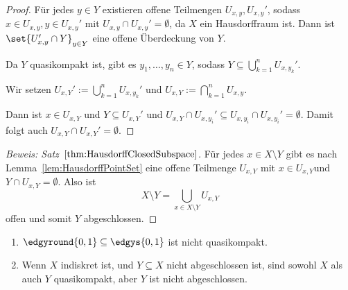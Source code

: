 \documentclass[language=ngerman]{TemplateLecture} %
\begin{document}
\begin{proof}
    Für jedes $y \in Y$ existieren offene Teilmengen $U_{x,y}, U_{x,y}'$, sodass $x \in U_{x,y}, y \in U_{x,y}'$ mit $U_{x,y} \cap U_{x,y}' = \emptyset$, da $X$ ein Hausdorffraum ist. Dann ist $\set{U_{x,y}' \cap Y}_{y \in Y}$ eine offene Überdeckung von $Y$.
    
    Da $Y$ quasikompakt ist, gibt es $y_1, \ldots, y_n \in Y$, sodass $Y \subseteq \bigcup_{k = 1}^n U_{x,y_k}'$.

    Wir setzen $U_{x,Y}' := \bigcup_{k = 1}^n U_{x,y_k}'$ und $U_{x,Y} := \bigcap_{k = 1}^n U_{x,y}$.

    Dann ist $x \in U_{x,Y}$ und $Y \subseteq U_{x,Y}'$ und $U_{x,Y} \cap U_{x,y_i}' \subseteq U_{x,y_i} \cap U_{x,y_i}' = \emptyset$. Damit folgt auch $U_{x,Y} \cap U_{x,Y}' = \emptyset$.
\end{proof}

\begin{proof}[Beweis: Satz~$\ref{thm:HausdorffClosedSubspace}$]
    Für jedes $x \in X \setminus Y$ gibt es nach Lemma~\ref{lem:HausdorffPointSet} eine offene Teilmenge $U_{x,Y}$ mit $x \in U_{x,Y}$und $Y \cap U_{x,Y} = \emptyset$. Also ist
    \begin{equation*}
        X \setminus Y = \bigcup_{x \in X \setminus Y} U_{x,Y}
    \end{equation*} 
    offen und somit $Y$ abgeschlossen.
\end{proof}

\begin{example}\leavevmode
    \begin{enumerate}[$(i)$]
        \item $\edgyround{0,1} \subseteq \edgys{0,1}$ ist nicht quasikompakt. 
        \item Wenn $X$ indiskret ist, und $Y \subseteq X$ nicht abgeschlossen ist, sind sowohl $X$ als auch $Y$ quasikompakt, aber $Y$ ist nicht abgeschlossen.
    \end{enumerate}
    
\end{example}




\end{document}
